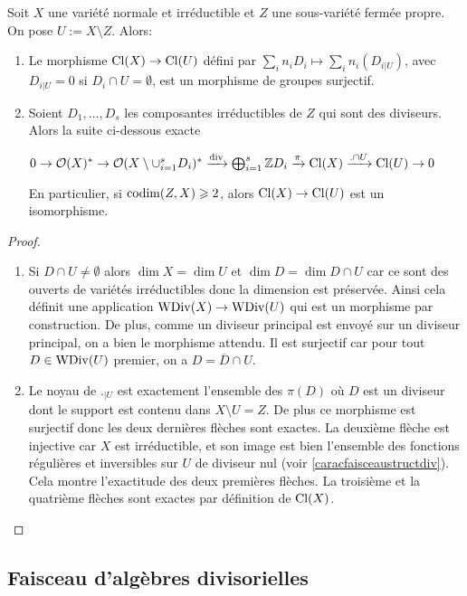 \begin{thm}\label{divexactseq}
Soit $X$ une variété normale et irréductible et $Z$ une sous-variété fermée propre. On pose $U:=X\setminus Z$. Alors:
\begin{enumerate}
\item Le morphisme $\operatorname{Cl}(X)\rightarrow\operatorname{Cl}(U)$ défini par $\sum_i n_iD_i\mapsto \sum_i n_i(D_{i|U})$, avec $D_{i|U} = 0$ si $D_i\cap U=\emptyset $, est un morphisme de groupes surjectif.
\item Soient $D_1,..., D_s$ les composantes irréductibles de $Z$ qui sont des diviseurs. Alors la suite ci-dessous exacte
\begin{center}
 $0\rightarrow\mathcal{O}(X)^*\rightarrow \mathcal{O}(X\setminus \cup_{i=1}^s D_i)^*\xrightarrow{\operatorname{div}} \bigoplus_{i=1}^s \mathbb{Z} D_i \xrightarrow{\pi} \operatorname{Cl}(X) \xrightarrow{.\cap U} \operatorname{Cl}(U) \rightarrow 0 $
\end{center}
En particulier, si $\operatorname{codim}(Z,X)\geqslant 2$, alors $\operatorname{Cl}(X)\rightarrow \operatorname{Cl}(U)$ est un isomorphisme.


\end{enumerate}
\end{thm}
\begin{proof}
\begin{enumerate}
\item Si $D\cap U\neq \emptyset$ alors $\dim X=\dim U$ et $\dim D=\dim D\cap U$ car ce sont des ouverts de variétés irréductibles donc la dimension est préservée. Ainsi cela définit une application $\operatorname{WDiv}(X)\rightarrow \operatorname{WDiv}(U)$ qui est un morphisme par construction. De plus, comme un diviseur principal est envoyé sur un diviseur principal, on a bien le morphisme attendu. Il est surjectif car pour tout $D\in\operatorname{WDiv}(U)$ premier, on a $D=\overline{D}\cap U$.
\item Le noyau de $._{|U}$ est exactement l'ensemble des $\pi(D)$ où $D$ est un diviseur dont le support est contenu dans $X\setminus U=Z$. De plus ce morphisme est surjectif donc les deux dernières flèches sont exactes. La deuxième flèche est injective car $X$ est irréductible, et son image est bien l'ensemble des fonctions régulières et inversibles sur $U$ de diviseur nul (voir \ref{caracfaisceaustructdiv}). Cela montre l'exactitude des deux premières flèches. La troisième et la quatrième flèches sont exactes par définition de $\operatorname{Cl}(X)$.
\end{enumerate}
\end{proof}

\subsection{Faisceau d'algèbres divisorielles}


